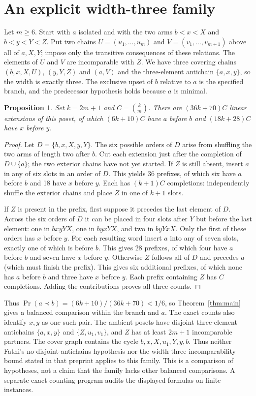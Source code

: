 \documentclass[11pt]{article}
\newtheorem{proposition}{Proposition}
\newcommand{\PrE}{\Pr}
\begin{document}
\section{An explicit width-three family}
Let $m\ge 6$. Start with $a$ isolated and with the two arms
$b<x<X$ and $b<y<Y<Z$. Put two chains $U=(u_1,\ldots,u_m)$
and $V=(v_1,\ldots,v_{m+1})$ above all of $a,X,Y$; impose only
the transitive consequences of these relations. The elements of
$U$ and $V$ are incomparable with $Z$. We have three covering chains
$(b,x,X,U)$, $(y,Y,Z)$ and $(a,V)$ and the three-element antichain
$\{a,x,y\}$, so the width is exactly three. The exclusive upset of
$b$ relative to $a$ is the specified branch, and the predecessor
hypothesis holds because $a$ is minimal.

\begin{proposition}
Set $k=2m+1$ and $C=\binom{k}{m}$. There are $(36k+70)C$ linear
extensions of this poset, of which $(6k+10)C$ have $a$ before $b$
and $(18k+28)C$ have $x$ before $y$.
\end{proposition}
\begin{proof}
Let $D=\{b,x,X,y,Y\}$. The six possible orders of $D$ arise from
shuffling the two arms of length two after $b$. Cut each extension
just after the completion of $D\cup\{a\}$; the two exterior chains
have not yet started. If $Z$ is still absent, insert $a$ in any of
six slots in an order of $D$. This yields 36 prefixes, of which six
have $a$ before $b$ and 18 have $x$ before $y$. Each has $(k+1)C$
completions: independently shuffle the exterior chains and place $Z$
in one of $k+1$ slots.

If $Z$ is present in the prefix, first suppose it precedes the last
element of $D$. Across the six orders of $D$ it can be placed in
four slots after $Y$ but before the last element: one in $bx yY X$,
one in $by xY X$, and two in $byY xX$. Only the first of these
orders has $x$ before $y$. For each resulting
word insert $a$ into any of seven slots, exactly one of which is
before $b$. This gives 28 prefixes, of which four have $a$ before
$b$ and seven have $x$ before $y$. Otherwise $Z$ follows all of $D$
and precedes $a$ (which must finish the prefix). This gives six
additional prefixes, of which none has $a$ before $b$ and three
have $x$ before $y$. Each prefix containing $Z$ has $C$ completions.
Adding the contributions proves all three counts.
\end{proof}

Thus $\PrE(a\prec b)=(6k+10)/(36k+70)<1/6$, so
Theorem~\ref{thm:main} gives a balanced comparison within the branch
and $a$. The exact counts also identify $x,y$ as one such pair.
The ambient posets have disjoint three-element antichains
$\{a,x,y\}$ and $\{Z,u_1,v_1\}$, and $Z$ has at least $2m+1$
incomparable partners. The cover graph contains the cycle
$b,x,X,u_1,Y,y,b$. Thus neither Fathi's no-disjoint-antichains
hypothesis nor the width-three incomparability bound stated in
that preprint \cite{fathi} applies to this family. This is a
comparison of hypotheses, not a claim that the family lacks other
balanced comparisons. A separate exact counting program audits
the displayed formulas on finite instances.
\end{document}
